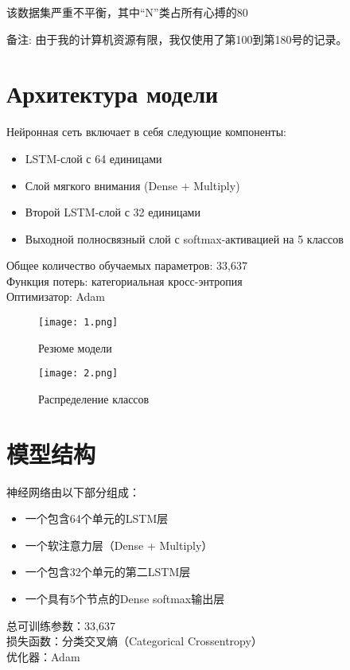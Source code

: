 \documentclass{article}
\providecommand{\pcsync}{\par\vspace{\baselineskip}}
\begin{document}
\begin{paracol}{2}
该数据集严重不平衡，其中“N”类占所有心搏的80%
\pcsync
备注: 由于我的计算机资源有限，我仅使用了第100到第180号的记录。

\switchcolumn*



\section{Архитектура модели}
\pcsync
Нейронная сеть включает в себя следующие компоненты:
\begin{itemize}
    \item LSTM-слой с 64 единицами
    \item Слой мягкого внимания (Dense + Multiply)
    \item Второй LSTM-слой с 32 единицами
    \item Выходной полносвязный слой с softmax-активацией на 5 классов
\end{itemize}

Общее количество обучаемых параметров: 33,637 \\
Функция потерь: категориальная кросс-энтропия \\
Оптимизатор: Adam

\begin{figure}[H]
    \centering
    \texttt{[image: 1.png]}
    \caption{Резюме модели}
    \label{fig:enter-label}
\end{figure}


\begin{figure}[H]
    \centering
    \texttt{[image: 2.png]}
    \caption{Распределение классов}
    \label{fig:enter-label}
\end{figure}



\switchcolumn

\section{模型结构}
\pcsync
神经网络由以下部分组成：
\begin{itemize}
    \item 一个包含64个单元的LSTM层
    \item 一个软注意力层（Dense + Multiply）
    \item 一个包含32个单元的第二LSTM层
    \item 一个具有5个节点的Dense softmax输出层
\end{itemize}

总可训练参数：33,637 \\
损失函数：分类交叉熵（Categorical Crossentropy）\\
优化器：Adam


\end{paracol}
\end{document}
